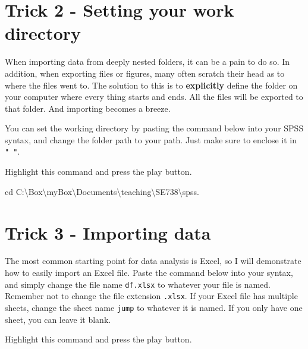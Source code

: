 \documentclass[
]{book}
\newenvironment{Shaded}{\begin{snugshade}}{\end{snugshade}}
\newcommand{\NormalTok}[1]{#1}
\newcommand{\SpecialCharTok}[1]{\textcolor[rgb]{0.00,0.00,0.00}{#1}}
\newcommand{\StringTok}[1]{\textcolor[rgb]{0.31,0.60,0.02}{#1}}
\begin{document}
\hypertarget{trick-2---setting-your-work-directory}{%
\chapter*{Trick 2 - Setting your work directory}\label{trick-2---setting-your-work-directory}}

When importing data from deeply nested folders, it can be a pain to do so. In addition, when exporting files or figures, many often scratch their head as to where the files went to. The solution to this is to \textbf{explicitly} define the folder on your computer where every thing starts and ends. All the files will be exported to that folder. And importing becomes a breeze.

You can set the working directory by pasting the command below into your SPSS syntax, and change the folder path to your path. Just make sure to enclose it in \texttt{"\ "}.

Highlight this command and press the play button.

\begin{Shaded}
\begin{Highlighting}[]
\NormalTok{cd }\StringTok{\textquotesingle{}C:\textbackslash{}Box\textbackslash{}myBox\textbackslash{}Documents}\SpecialCharTok{\textbackslash{}t}\StringTok{eaching\textbackslash{}SE738\textbackslash{}spss\textquotesingle{}}\NormalTok{.}
\end{Highlighting}
\end{Shaded}

\hypertarget{trick-3---importing-data}{%
\chapter*{Trick 3 - Importing data}\label{trick-3---importing-data}}

The most common starting point for data analysis is Excel, so I will demonstrate how to easily import an Excel file. Paste the command below into your syntax, and simply change the file name \texttt{df.xlsx} to whatever your file is named. Remember not to change the file extension \texttt{.xlsx}. If your Excel file has multiple sheets, change the sheet name \texttt{jump} to whatever it is named. If you only have one sheet, you can leave it blank.

Highlight this command and press the play button.
\end{document}
